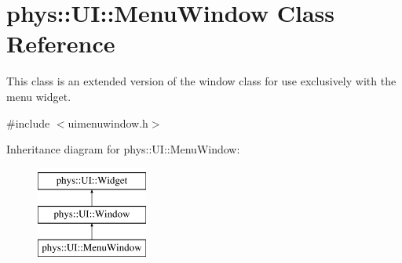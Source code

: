 \hypertarget{classphys_1_1UI_1_1MenuWindow}{
\section{phys::UI::MenuWindow Class Reference}
\label{d4/d07/classphys_1_1UI_1_1MenuWindow}
}


This class is an extended version of the window class for use exclusively with the menu widget.  




{\ttfamily \#include $<$uimenuwindow.h$>$}

Inheritance diagram for phys::UI::MenuWindow:\begin{figure}[H]
\begin{center}
\leavevmode
\includegraphics[height=3cm]{d4/d07/classphys_1_1UI_1_1MenuWindow}
\end{center}
\end{figure}
